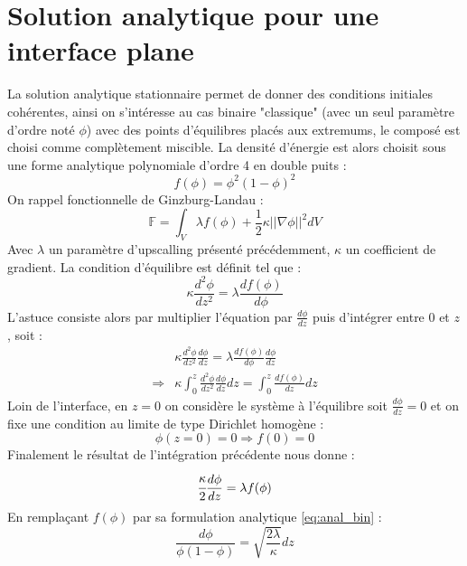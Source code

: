 
\chapter{Solution analytique pour une interface plane}
La solution analytique stationnaire permet de donner des conditions initiales cohérentes, ainsi on s'intéresse au cas binaire "classique" (avec un seul paramètre d'ordre noté $\phi$) avec des points d'équilibres placés aux extremums, le composé est choisi comme complètement miscible. La densité d'énergie est alors choisit sous une forme analytique polynomiale d'ordre 4 en double puits :
\begin{equation}
	f(\phi) = \phi^2 (1-\phi)^2
	\label{eq:anal_bin}
\end{equation}
On rappel fonctionnelle de Ginzburg-Landau :
\begin{equation}
	\mathbb{F} =\int_V \lambda f(\phi) + \frac{1}{2}\kappa ||\nabla \phi||^2 dV
\end{equation}
Avec $\lambda$ un paramètre d'upscalling présenté précédemment, $\kappa$ un coefficient de gradient.
La condition d'équilibre est définit tel que :
\begin{equation}
	\kappa \frac{d^2\phi}{dz^2} = \lambda \frac{d f(\phi)}{d\phi}
\end{equation}
L'astuce consiste alors par multiplier l'équation par $\displaystyle \frac{d\phi}{dz}$ puis d'intégrer entre 0 et $z$, soit :
\begin{align}
	& \kappa \frac{d^2\phi}{dz^2}\frac{d\phi}{dz} = \lambda \frac{d f(\phi)}{d\phi}\frac{d\phi}{dz} \\
	\Rightarrow & \kappa \int_0^z \frac{d^2\phi}{dz^2}\frac{d\phi}{dz} dz= \int_0^z \frac{d f(\phi)}{dz} dz
\end{align}
Loin de l'interface, en $z=0$ on considère le système à l'équilibre soit $\frac{d\phi}{dz} = 0$ et on fixe une condition au limite de type Dirichlet homogène :
\begin{equation}
	\phi (z= 0) = 0 \Rightarrow f(0) = 0
\end{equation}
Finalement le résultat de l'intégration précédente nous donne :
\begin{equation}
		\cfrac{\kappa}{2} \frac{d\phi}{dz} = \lambda f(\phi)
\end{equation}
En remplaçant $f(\phi)$ par sa formulation analytique \ref{eq:anal_bin} : 
\begin{equation}
	\frac{d\phi}{\phi(1-\phi)} = \sqrt{\frac{2\lambda}{\kappa}} dz
	\label{solution_statio_plane}
\end{equation}
